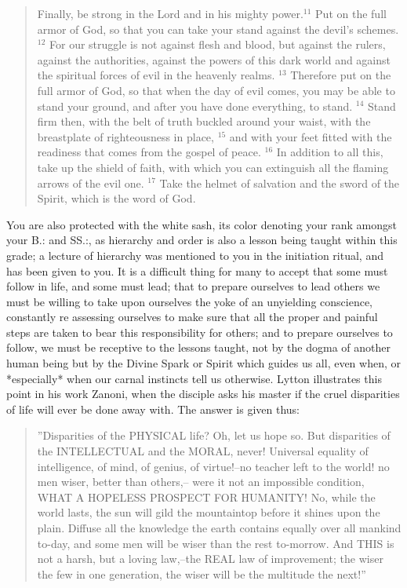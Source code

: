 \begin{quote}
	Finally, be strong in the Lord and in his mighty power.$^{11}$ Put on the full armor of God, so that you can
	take your stand against the devil’s schemes. $^{12}$ For our struggle is not against flesh and blood, but
	against the rulers, against the authorities, against the powers of this dark world and against the
	spiritual forces of evil in the heavenly realms. $^{13}$ Therefore put on the full armor of God, so that when
	the day of evil comes, you may be able to stand your ground, and after you have done everything, to
	stand. $^{14}$ Stand firm then, with the belt of truth buckled around your waist, with the breastplate of righteousness in place, $^{15}$ and with your feet fitted with the readiness that comes from the gospel of
	peace. $^{16}$ In addition to all this, take up the shield of faith, with which you can extinguish all the flaming
	arrows of the evil one. $^{17}$ Take the helmet of salvation and the sword of the Spirit, which is the word of
	God. 
\end{quote}

You are also protected with the white sash, its color denoting your rank amongst your B.: and SS.:, as
hierarchy and order is also a lesson being taught within this grade; a lecture of hierarchy was
mentioned to you in the initiation ritual, and has been given to you. It is a difficult thing for many to
accept that some must follow in life, and some must lead; that to prepare ourselves to lead others we
must be willing to take upon ourselves the yoke of an unyielding conscience, constantly re assessing
ourselves to make sure that all the proper and painful steps are taken to bear this responsibility for
others; and to prepare ourselves to follow, we must be receptive to the lessons taught, not by the
dogma of another human being but by the Divine Spark or Spirit which guides us all, even when, or
*especially* when our carnal instincts tell us otherwise. Lytton illustrates this point in his work Zanoni,
when the disciple asks his master if the cruel disparities of life will ever be done away with. The
answer is given thus: 


\begin{quote}
	''Disparities of the PHYSICAL life? Oh, let us hope so. But disparities of the INTELLECTUAL and
	the MORAL, never! Universal equality of intelligence, of mind, of genius, of virtue!--no teacher left to
	the world! no men wiser, better than others,-- were it not an impossible condition, WHAT A
	HOPELESS PROSPECT FOR HUMANITY! No, while the world lasts, the sun will gild the mountaintop
	before it shines upon the plain. Diffuse all the knowledge the earth contains equally over all
	mankind to-day, and some men will be wiser than the rest to-morrow. And THIS is not a harsh, but a
	loving law,--the REAL law of improvement; the wiser the few in one generation, the wiser will be the
	multitude the next!'' 
\end{quote}

